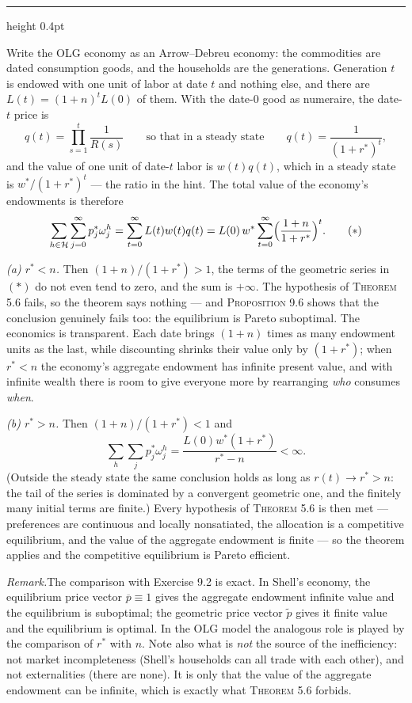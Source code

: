 \documentclass[11pt,letterpaper,reqno]{amsart}
\makeatletter
\newcommand{\wt}[1]{\widetilde{#1}}
\newcommand{\ol}[1]{\overline{#1}}
\newcommand{\as@head}[3]{%
  \par\addvspace{1.6ex}\penalty-200\relax
  \phantomsection
  \addcontentsline{toc}{subsection}{#1 #2\texorpdfstring{\ifx\relax#3\relax\else\quad #3\fi}{}}%
  {\color{RuleGrey}\hrule height 0.4pt}%
  \nobreak\vspace{0.8ex}\nobreak
  \noindent{\bfseries #1 #2}%
  \ifx\relax#3\relax\else\quad{\bfseries\itshape #3}\fi
  \par\nobreak\vspace{0.4ex}\nobreak
  \as@beginstatement
}
\newcommand{\as@beginstatement}{\begingroup\itshape\ignorespaces}
\newenvironment{aex}[2]{\as@head{Exercise}{#1}{#2}}{\par\addvspace{1.2ex}}
\newcommand{\rmk}[1]{%
  \par\vspace{0.6ex}%
  {\small\noindent\textit{Remark.}\hspace{0.5em}#1\par}%
  \vspace{0.4ex}%
}
\newcommand{\bk}[1]{\textup{\textsc{#1}}}
\renewcommand{\as@beginstatement}{\ignorespaces}
\makeatother
\begin{document}
\begin{aex}{9.11}{}
Write the OLG economy as an Arrow--Debreu economy: the commodities are dated consumption goods,
and the households are the generations.  Generation $t$ is endowed with one unit of labor at date
$t$ and nothing else, and there are $L(t)=(1+n)^{t}L(0)$ of them.  With the date-$0$ good as
numeraire, the date-$t$ price is
\[
q(t)=\prod_{s=1}^{t}\frac{1}{R(s)}
\qquad\text{so that in a steady state}\qquad
q(t)=\frac{1}{(1+r^{*})^{t}} ,
\]
and the value of one unit of date-$t$ labor is $w(t)q(t)$, which in a steady state is
$w^{*}/(1+r^{*})^{t}$ --- the ratio in the hint.  The total value of the economy's endowments is
therefore
\[
\sum_{h\in\mathcal H}\sum_{j=0}^{\infty}p^{*}_{j}\omega^{h}_{j}
=\sum_{t=0}^{\infty}L(t)w(t)q(t)
=L(0)\,w^{*}\sum_{t=0}^{\infty}\Bigl(\frac{1+n}{1+r^{*}}\Bigr)^{t} .
\tag{$*$}
\]

\emph{(a) $r^{*}<n$.}  Then $(1+n)/(1+r^{*})>1$, the terms of the geometric series in $(*)$ do not
even tend to zero, and the sum is $+\infty$.  The hypothesis of \bk{Theorem 5.6} fails, so the
theorem says nothing --- and \bk{Proposition 9.6} shows that the conclusion genuinely fails too:
the equilibrium is Pareto suboptimal.  The economics is transparent.  Each date brings $(1+n)$
times as many endowment units as the last, while discounting shrinks their value only by
$(1+r^{*})$; when $r^{*}<n$ the economy's aggregate endowment has infinite present value, and
with infinite wealth there is room to give everyone more by rearranging \emph{who} consumes
\emph{when}.

\emph{(b) $r^{*}>n$.}  Then $(1+n)/(1+r^{*})<1$ and
\[
\sum_{h}\sum_{j}p^{*}_{j}\omega^{h}_{j}=\frac{L(0)w^{*}(1+r^{*})}{r^{*}-n}<\infty .
\]
(Outside the steady state the same conclusion holds as long as $r(t)\to r^{*}>n$: the tail of the
series is dominated by a convergent geometric one, and the finitely many initial terms are
finite.)  Every hypothesis of \bk{Theorem 5.6} is then met --- preferences are continuous and
locally nonsatiated, the allocation is a competitive equilibrium, and the value of the aggregate
endowment is finite --- so the theorem applies and the competitive equilibrium is Pareto
efficient.

\rmk{The comparison with Exercise 9.2 is exact.  In Shell's economy, the equilibrium price vector
$\ol p\equiv1$ gives the aggregate endowment infinite value and the equilibrium is suboptimal;
the geometric price vector $\wt p$ gives it finite value and the equilibrium is optimal.  In the
OLG model the analogous role is played by the comparison of $r^{*}$ with $n$.  Note also what is
\emph{not} the source of the inefficiency: not market incompleteness (Shell's households can all
trade with each other), and not externalities (there are none).  It is only that the value of the
aggregate endowment can be infinite, which is exactly what \bk{Theorem 5.6} forbids.}
\end{aex}
\end{document}
